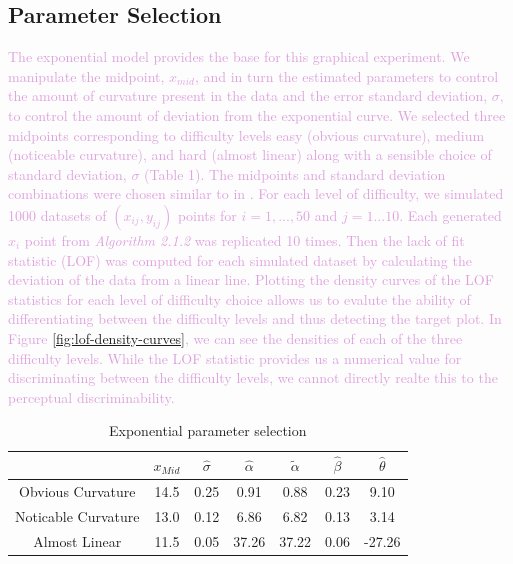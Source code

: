 \documentclass[]{interact}
\theoremstyle{plain}%
\theoremstyle{definition}
\theoremstyle{remark}
\begin{document}
\hypertarget{parameter-selection}{%
\subsection{Parameter Selection}\label{parameter-selection}}

\textcolor{Plum}{
The exponential model provides the base for this graphical experiment. 
We manipulate the midpoint, $x_{mid}$, and in turn the estimated parameters to control the amount of curvature present in the data and the error standard deviation, $\sigma$, to control the amount of deviation from the exponential curve.
We selected three midpoints corresponding to difficulty levels easy (obvious curvature), medium (noticeable curvature), and hard (almost linear) along with a sensible choice of standard deviation, $\sigma$ (Table 1).
The midpoints and standard deviation combinations were chosen similar to in \cite{vanderplas_clusters_2017}. 
For each level of difficulty, we simulated 1000 datasets of $(x_{ij}, y_{ij})$ points for $i = 1,...,50$ and $j = 1...10$. 
Each generated $x_i$ point from \textit{Algorithm 2.1.2} was replicated 10 times.  
Then the lack of fit statistic (LOF) was computed for each simulated dataset by calculating the deviation of the data from a linear line. 
Plotting the density curves of the LOF statistics for each level of difficulty choice allows us to evalute the ability of differentiating between the difficulty levels and thus detecting the target plot.
In Figure \ref{fig:lof-density-curves}, we can see the densities of each of the three difficulty levels. 
While the LOF statistic provides us a numerical value for discriminating between the difficulty levels, we cannot directly realte this to the perceptual discriminability. 
}

\begin{table}

\caption{\label{tab:parameter-data}Exponential parameter selection}
\centering
\begin{tabular}[t]{ccccccc}
\toprule
 & $x_{Mid}$ & $\hat\sigma$ & $\hat\alpha$ & $\tilde\alpha$ & $\hat\beta$ & $\hat\theta$\\
\midrule
Obvious Curvature & 14.5 & 0.25 & 0.91 & 0.88 & 0.23 & 9.10\\
Noticable Curvature & 13.0 & 0.12 & 6.86 & 6.82 & 0.13 & 3.14\\
Almost Linear & 11.5 & 0.05 & 37.26 & 37.22 & 0.06 & -27.26\\
\bottomrule
\end{tabular}
\end{table}
\end{document}
